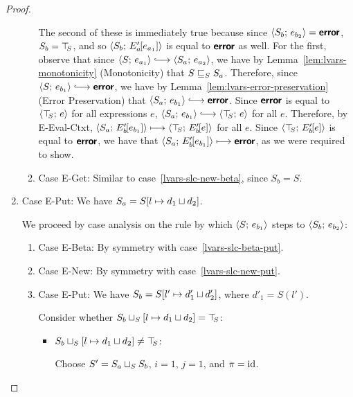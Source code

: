 \begin{proof}
\begin{enumerate}
\begin{enumerate}
      The second of these is immediately true because since
      $\langle S_b;\, e_{b_2} \rangle = \textbf{\textsf{error}}$, $S_b = \top\hspace{-0.85mm}_{S}$, and so
      $\langle S_b;\, E'_a\hspace{-1mm}\left[e_{a_1}\right] \rangle$ is equal to $\textbf{\textsf{error}}$ as
      well.  For the first, observe that since $\config{S}{e_{a_1}}
      \parstepsto \config{S_a}{e_{a_2}}$, we have by
      Lemma~\ref{lem:lvars-monotonicity} (Monotonicity) that
      $S \sqsubseteq_S S_a$.  Therefore, since $\config{S}{e_{b_1}}
      \parstepsto \error$, we have by
      Lemma~\ref{lem:lvars-error-preservation} (Error Preservation)
      that $\config{S_a}{e_{b_1}} \parstepsto \error$.  Since $\textbf{\textsf{error}}$
      is equal to $\langle \top\hspace{-0.85mm}_{S};\, e \rangle$ for all expressions $e$,
      $\config{S_a}{e_{b_1}} \parstepsto \config{\topS}{e}$ for all
      $e$.  Therefore, by {\sc E-Eval-Ctxt},
      $\langle S_a;\, E'_b\hspace{-1mm}\left[e_{b_1}\right] \rangle \longmapsto
      \langle \top\hspace{-0.85mm}_{S};\, E'_b\hspace{-1mm}\left[e\right] \rangle$ for all $e$.  Since
      $\langle \top\hspace{-0.85mm}_{S};\, E'_b\hspace{-1mm}\left[e\right] \rangle$ is equal to $\textbf{\textsf{error}}$, we
      have that $\langle S_a;\, E'_b\hspace{-1mm}\left[e_{b_1}\right] \rangle \longmapsto
      \textbf{\textsf{error}}$, as we were required to show.

    \item \label{lvars-slc-new-get}Case {\sc E-Get}: Similar to
      case~\ref{lvars-slc-new-beta}, since $S_b = S$.
    \end{enumerate}
  \item Case {\sc E-Put}: We have $S_a =
    S[l \mapsto d_1 \sqcup d_2]$.

    We proceed by case analysis on the rule by which
    $\langle S;\, e_{b_1} \rangle$ steps to $\langle S_b;\, e_{b_2} \rangle$:
    \begin{enumerate}
    \item \label{lvars-slc-put-beta}Case {\sc E-Beta}: By symmetry with case~\ref{lvars-slc-beta-put}.
    \item \label{lvars-slc-put-new}Case {\sc E-New}: By symmetry with case~\ref{lvars-slc-new-put}.
    \item \label{lvars-slc-put-put}Case {\sc E-Put}: We have $S_b =
      S[l' \mapsto d'_1 \sqcup d'_2]$, where $d'_1 = S(l')$.

      Consider whether
      $S_b \sqcup_{S} \left[ l \mapsto d_1 \sqcup d_2 \right]
      = \top\hspace{-0.85mm}_{S}$:

      \begin{itemize}
      \item
        $S_b \sqcup_{S} \left[ l \mapsto d_1 \sqcup d_2 \right]
        \neq \top\hspace{-0.85mm}_{S}$:

        Choose $S' = S_a \sqcup_{S} S_b$, $i = 1$, $j = 1$, and $\pi =
        \mathrm{id}$.


\end{itemize}
\end{enumerate}
\end{enumerate}
\end{proof}
